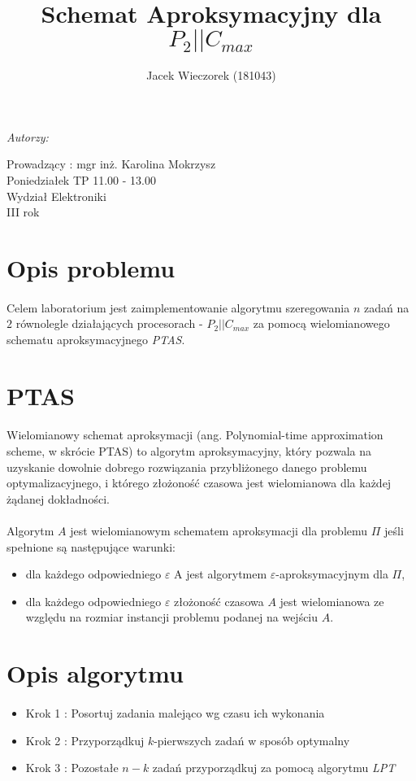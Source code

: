 \documentclass[wide,a4paper,titlepage,12pt] {article}
\title{Schemat Aproksymacyjny dla $P_{2}||C_{max}$}
\author{Jacek Wieczorek (181043)}
\makeatletter
\renewcommand{\maketitle}{
  \begin{titlepage}
    \begin{center}
      \vspace*{3cm}
      \LARGE \@title \par
      \vspace{2cm}
      \textit{\small Autorzy:}\par
      \normalsize \@author\par \normalsize
      \vspace{3cm}
      Prowadzący : mgr inż. Karolina Mokrzysz\\
      Poniedziałek TP 11.00 - 13.00\\
      \vspace{3cm}
      Wydział Elektroniki\\ III rok \par
      \vspace{3cm}
      \small \@date
    \end{center}
  \end{titlepage}
}
\makeatother
\begin{document}
  \maketitle
  \section{Opis problemu}
\paragraph{}
 Celem laboratorium jest zaimplementowanie algorytmu szeregowania $n$ zadań na $2$ równolegle działających procesorach -  $P_{2} || C_{max}$ za pomocą wielomianowego schematu aproksymacyjnego \textit{PTAS}.

\section{PTAS}
\paragraph{}
Wielomianowy schemat aproksymacji (ang. Polynomial-time approximation scheme, w skrócie PTAS) to algorytm aproksymacyjny, który pozwala na uzyskanie dowolnie dobrego rozwiązania przybliżonego danego problemu optymalizacyjnego, i którego złożoność czasowa jest wielomianowa dla każdej żądanej dokładności.

\paragraph{}
Algorytm $A$ jest wielomianowym schematem aproksymacji dla problemu $\Pi$ jeśli spełnione są następujące warunki:
\begin{itemize}
    \item dla każdego odpowiedniego $\varepsilon$ A jest algorytmem $\varepsilon$-aproksymacyjnym dla $\Pi$,
    \item dla każdego odpowiedniego $\varepsilon$ złożoność czasowa $A$ jest wielomianowa ze względu na rozmiar instancji problemu podanej na wejściu $A$.
\end{itemize}

\section{Opis algorytmu}
\paragraph{}
\begin{itemize}
  \item Krok 1 : Posortuj zadania malejąco wg czasu ich wykonania
  \item Krok 2 : Przyporządkuj $k$-pierwszych zadań w sposób optymalny
  \item Krok 3 : Pozostałe $n-k$ zadań przyporządkuj za pomocą algorytmu \textit{LPT} 
\end{itemize}
\end{document}
